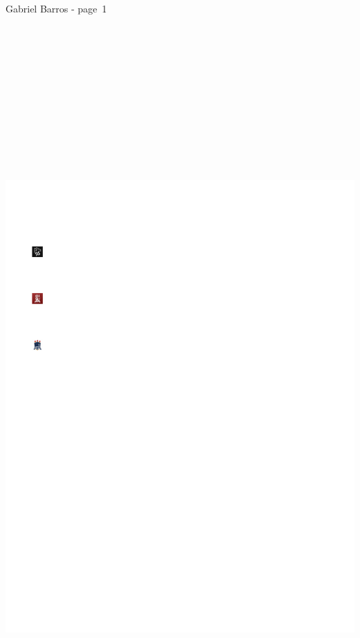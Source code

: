 Gabriel Barros - page~1

\hypertarget{page2-div}{}
\includegraphics[width=9.5625in,height=12.375in]{Resume-Gabriel-Barros002.png}

